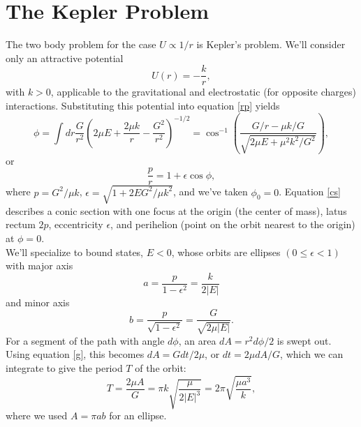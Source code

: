 \documentclass[10pt]{article}
\begin{document}
\section{The Kepler Problem}
\noindent The two body problem for the case $U \propto 1/r$ is Kepler's problem. We'll consider only an attractive potential
\begin{equation}\label{pot}
U\left(r\right) = - \frac{k}{r},
\end{equation}
\noindent with $k > 0$, applicable to the gravitational and electrostatic (for opposite charges) interactions. Substituting this potential  into equation \ref{rp} yields
\begin{equation}\label{solvephi}
\phi = \int dr \frac{G}{r^2} \left(2\mu E+ \frac{2 \mu k}{r}-\frac{G^2}{ r^2}\right)^{-1/2} = \cos^{-1}\left(\frac{G / r - \mu k / G}{\sqrt{2 \mu E + \mu^2 k^2 / G^2}}\right),
\end{equation}
\noindent or
\begin{equation}\label{cs}
\frac{p}{r} = 1+\epsilon \cos \phi,
\end{equation}
\noindent where $p = G^2 / \mu k$, $\epsilon = \sqrt{1+2 E G^2 / \mu k^2}$, and we've taken $\phi_0 = 0$. Equation \ref{cs} describes a conic section with one focus at the origin (the center of mass), latus rectum $2p$, eccentricity $\epsilon$, and perihelion (point on the orbit nearest to the origin) at $\phi = 0$. \\

\noindent We'll specialize to bound states, $E < 0$, whose orbits are ellipses $\left(0 \le \epsilon < 1\right)$ with major axis
\begin{equation*}
a = \frac{p}{1-\epsilon^2} = \frac{k}{2\left|E\right|}
\end{equation*}
\noindent and minor axis
\begin{equation*}
b = \frac{p}{\sqrt{1-\epsilon^2}} = \frac{G}{\sqrt{2 \mu \left|E\right|}}.
\end{equation*}
\noindent For a segment of the path with angle $d\phi$, an area $dA = r^2 d\phi / 2$ is swept out. Using equation \ref{g}, this becomes $dA = G dt / 2 \mu$, or $dt = 2 \mu dA / G$, which we can integrate to give the period $T$ of the orbit:
\begin{equation*}
T = \frac{2 \mu A}{G} = \pi k \sqrt{\frac{\mu}{2\left|E\right|^3}} = 2 \pi \sqrt{\frac{\mu a^3}{k}},
\end{equation*}
\noindent where we used $A = \pi a b$ for an ellipse. \\
\end{document}
